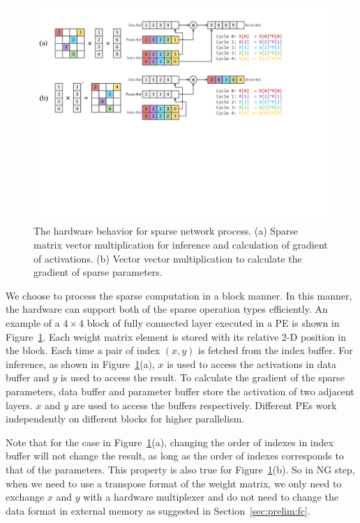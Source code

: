 \begin{figure}[t] 
  \centering
  \includegraphics[width=1.8\columnwidth]{figures/sparse_mv.pdf}
  \caption{The hardware behavior for sparse network process. (a) Sparse matrix vector multiplication for inference and calculation of gradient of activations. (b) Vector vector multiplication to calculate the gradient of sparse parameters. }
  \label{fig:spmv}
\end{figure}


We choose to process the sparse computation in a block manner. In this manner, the hardware can support both of the sparse operation types efficiently. An example of a $4\times 4$ block of fully connected layer executed in a PE is shown in Figure~\ref{fig:spmv}. Each weight matrix element is stored with its relative 2-D position in the block. Each time a pair of index $(x, y)$ is fetched from the index buffer. For inference, as shown in Figure~\ref{fig:spmv}(a), $x$ is used to access the activations in data buffer and $y$ is used to access the result. To calculate the gradient of the sparse parameters, data buffer and parameter buffer store the activation of two adjacent layers. $x$ and $y$ are used to access the buffers respectively. Different PEs work independently on different blocks for higher parallelism.

Note that for the case in Figure~\ref{fig:spmv}(a), changing the order of indexes in index buffer will not change the result, as long as the order of indexes corresponds to that of the parameters. This property is also true for Figure~\ref{fig:spmv}(b). So in NG step, when we need to use a transpose format of the weight matrix, we only need to exchange $x$ and $y$ with a hardware multiplexer and do not need to change the data format in external memory as suggested in Section~\ref{sec:prelim:fc}. 

